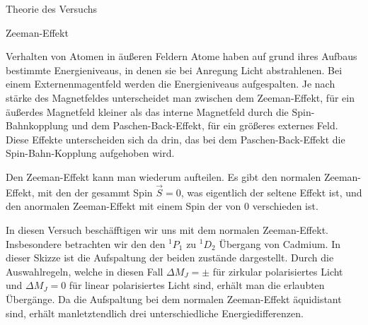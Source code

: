 \documentclass[pdftex, a4paper,11pt, twoside, ngerman]{report}
\begin{document}
  \begin{chapter}{Theorie des Versuchs}
    \label{chp:Theorie}
    
    \begin{section}{Zeeman-Effekt}

        \begin{subsection}{Verhalten von Atomen in äußeren Feldern}
            Atome haben auf grund ihres Aufbaus bestimmte Energieniveaus, in denen sie bei Anregung Licht abstrahlenen. 
            Bei einem Externenmagentfeld werden die Energieniveaus aufgespalten. 
            Je nach stärke des Magnetfeldes unterscheidet man zwischen dem Zeeman-Effekt, 
            für ein äußerdes Magnetfeld kleiner als das interne Magnetfeld durch die Spin-Bahnkopplung und dem Paschen-Back-Effekt, für ein größeres externes Feld.
            Diese Effekte unterscheiden sich da drin, das bei dem Paschen-Back-Effekt die Spin-Bahn-Kopplung aufgehoben wird.

            Den Zeeman-Effekt kann man wiederum aufteilen.
            Es gibt den normalen Zeeman-Effekt, mit den der gesammt Spin $\vec S = 0$, was eigentlich der seltene Effekt ist, und den anormalen Zeeman-Effekt mit einem Spin der von 0 verschieden ist.

            In diesen Versuch beschäfftigen wir uns mit dem normalen Zeeman-Effekt.
            Insbesondere betrachten wir den den ${}^1P_1$ zu ${}^1D_2$ Übergang von Cadmium.
            In dieser Skizze ist die Aufspaltung der beiden zustände dargestellt.
            Durch die Auswahlregeln, welche in diesen Fall $\Delta M_J = \pm$ für zirkular polarisiertes Licht und $\Delta M_J=0$ für linear polarisiertes Licht sind, erhält man die erlaubten Übergänge.
            Da die Aufspaltung bei dem normalen Zeeman-Effekt äquidistant sind, erhält manletztendlich drei unterschiedliche Energiedifferenzen.


\end{subsection}
\end{section}
\end{chapter}
\end{document}
